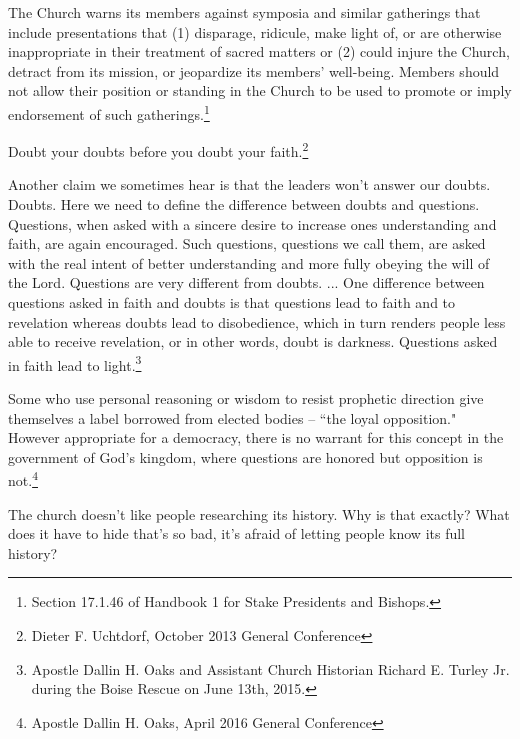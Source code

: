 \begin{displayquote}
The Church warns its members against symposia and similar gatherings that include
presentations that (1) disparage, ridicule, make light of, or are otherwise
inappropriate in their treatment of sacred matters or (2) could injure the Church,
detract from its mission, or jeopardize its members' well-being. Members should not
allow their position or standing in the Church to be used to promote or imply
endorsement of such gatherings.\footnote{Section 17.1.46 of Handbook 1 for Stake 
Presidents and Bishops.}
\end{displayquote}

\begin{displayquote}
Doubt your doubts before you doubt your faith.\footnote{Dieter F. Uchtdorf, 
October 2013 General Conference}
\end{displayquote}

\begin{displayquote}
Another claim we sometimes hear is that the leaders won't answer our doubts. Doubts.
Here we need to define the difference between doubts and questions. Questions, when
asked with a sincere desire to increase ones understanding and faith, are again
encouraged. Such questions, questions we call them, are asked with the real intent of
better understanding and more fully obeying the will of the Lord. Questions are very
different from doubts. ... One difference between questions asked in faith and doubts
is that questions lead to faith and to revelation whereas doubts lead to
disobedience, which in turn renders people less able to receive revelation, or in
other words, doubt is darkness. Questions asked in faith lead to light.\footnote{
Apostle Dallin H. Oaks and Assistant Church Historian Richard E. Turley Jr. 
during the Boise Rescue on June 13th, 2015.
}
\end{displayquote}

\begin{displayquote}
Some who use personal reasoning or wisdom to resist prophetic direction give
themselves a label borrowed from elected bodies -- ``the loyal opposition." However
appropriate for a democracy, there is no warrant for this concept in the government
of God's kingdom, where questions are honored but opposition is not.\footnote{
Apostle Dallin H. Oaks, April 2016 General Conference
}
\end{displayquote}

The church doesn't like people researching its history. Why is that exactly? What
does it have to hide that's so bad, it's afraid of letting people know its full
history?

